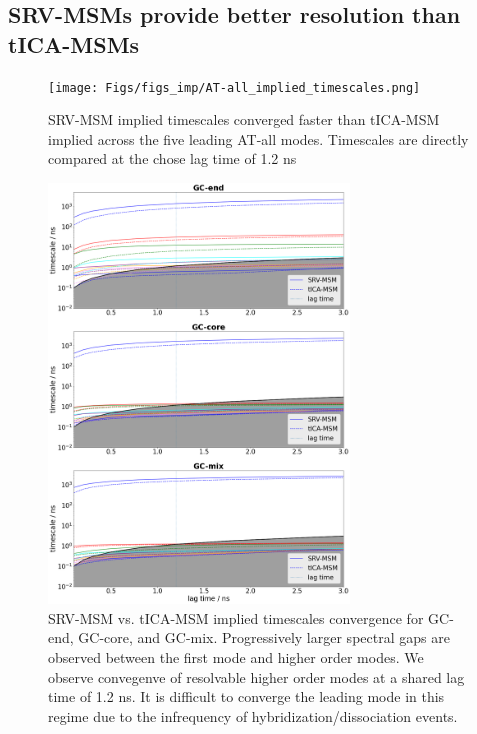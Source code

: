 \documentclass[journal=jpcbfk,manuscript=article]{achemso}
\begin{document}
\subsection{SRV-MSMs provide better resolution than tICA-MSMs} 

\begin{figure}[ht!]
	\begin{center}
        \texttt{[image: Figs/figs\_imp/AT-all\_implied\_timescales.png]}
        \caption{SRV-MSM implied timescales converged faster than tICA-MSM implied across the five leading AT-all modes. Timescales are directly compared at the chose lag time of 1.2 ns}
        \label{fig:AT-all_dynamic}
	\end{center}
\end{figure}
\begin{figure}[ht!]
	\begin{center}
        \includegraphics[width=80mm, 
        scale=0.5]{Figs/figs_imp/all_seq_implied_times.png}
        \caption{SRV-MSM vs. tICA-MSM implied timescales convergence for GC-end, GC-core, and GC-mix. Progressively larger spectral gaps are observed between the first mode and higher order modes. We observe convegenve of resolvable higher order modes at a shared lag time of 1.2 ns. It is difficult to converge the leading mode in this regime due to the infrequency of hybridization/dissociation events.}
        \label{fig:all_seq_lags}
	\end{center}
\end{figure}
\end{document}
